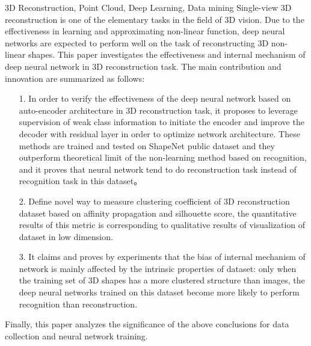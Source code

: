 \documentclass[bachelor, nocolorlinks, printoneside]{seuthesis} %
\begin{document}
\begin{englishabstract}{3D Reconstruction, Point Cloud, Deep Learning, Data mining}
    Single-view 3D reconstruction is one of the elementary tasks in the field of 3D vision. 
    Due to the effectiveness in learning and approximating non-linear function, deep neural networks are expected to perform well on the task of reconstructing 3D non-linear shapes.
    This paper investigates the effectiveness and internal mechanism of deep neural network in 3D reconstruction task. 
    The main contribution and innovation are summarized as follows:
    \begin{enumerate}
        \item[1.] In order to verify the effectiveness of the deep neural network based on auto-encoder architecture in 3D reconstruction task, 
        it proposes to leverage supervision of weak class information to initiate the encoder and improve the decoder with residual layer in order to optimize network architecture. 
        These methods are trained and tested on ShapeNet public dataset and they outperform theoretical limit of the non-learning method based on recognition, 
        and it proves that neural network tend to do reconstruction task instead of recognition task in this dataset。

        \item[2.] Define novel way to measure clustering coefficient of 3D reconstruction dataset based on affinity propagation and silhouette score, the quantitative results of this metric is corresponding to qualitative results of visualization of dataset in low dimension.
        \item[3.] It claims and proves by experiments that the bias of internal mechanism of network 
        is mainly affected by the intrinsic properties of dataset: only when the training set of 3D shapes has a 
        more clustered structure than images, the deep neural networks trained on this dataset become more likely 
        to perform recognition than reconstruction.
    \end{enumerate}
    Finally, this paper analyzes the significance of the above conclusions for data collection and neural network training.
\end{englishabstract}

\tableofcontents
\end{document}
